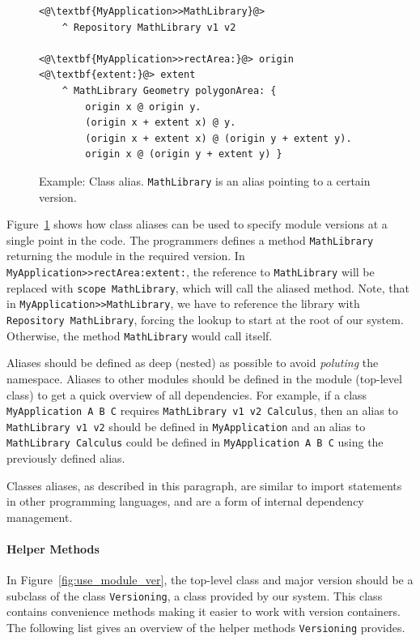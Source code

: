 \begin{figure}[!htp]
\begin{lstlisting}
<@\textbf{MyApplication>>MathLibrary}@>
    ^ Repository MathLibrary v1 v2

<@\textbf{MyApplication>>rectArea:}@> origin <@\textbf{extent:}@> extent
    ^ MathLibrary Geometry polygonArea: { 
        origin x @ origin y.
        (origin x + extent x) @ y.
        (origin x + extent x) @ (origin y + extent y).
        origin x @ (origin y + extent y) }
\end{lstlisting}
\caption[Example: Class alias]{Example: Class alias. \texttt{MathLibrary} is an alias pointing to a certain version.}
\label{fig:use_alias}
\end{figure}

Figure~\ref{fig:use_alias} shows how class aliases can be used to specify module versions at a single point in the code. The programmers defines a method \texttt{MathLibrary} returning the module in the required version. In \texttt{MyApplication>>rectArea:extent:}, the reference to \texttt{MathLibrary} will be replaced with \texttt{scope MathLibrary}, which will call the aliased method. Note, that in \texttt{MyApplication>>MathLibrary}, we have to reference the library with \texttt{Repository MathLibrary}, forcing the lookup to start at the root of our system. Otherwise, the method \texttt{MathLibrary} would call itself.

Aliases should be defined as deep (nested) as possible to avoid \emph{poluting} the namespace. Aliases to other modules should be defined in the module (top-level class) to get a quick overview of all dependencies. For example, if a class \texttt{MyApplication A B C} requires \texttt{MathLibrary v1 v2 Calculus}, then an alias to \texttt{MathLibrary v1 v2} should be defined in \texttt{MyApplication} and an alias to \texttt{MathLibrary Calculus} could be defined in \texttt{MyApplication A B C} using the previously defined alias.

Classes aliases, as described in this paragraph, are similar to import statements in other programming languages, and are a form of internal dependency management.

\paragraph{Helper Methods}
In Figure~\ref{fig:use_module_ver}, the top-level class and major version should be a subclass of the class \texttt{Versioning}, a class provided by our system. This class contains convenience methods making it easier to work with version containers. The following list gives an overview of the helper methods \texttt{Versioning} provides.

